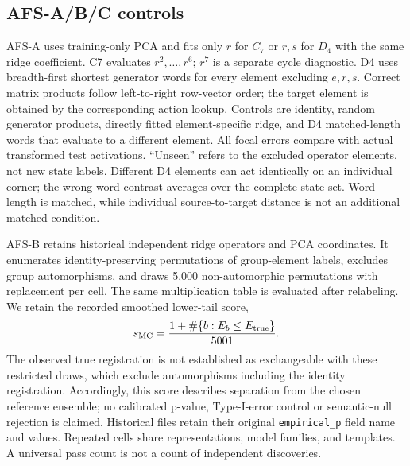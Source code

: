 \subsection{AFS-A/B/C controls}
AFS-A uses training-only PCA and fits only $r$ for $C_7$ or $r,s$ for $D_4$ with the same ridge coefficient. C7 evaluates $r^2,\ldots,r^6$; $r^7$ is a separate cycle diagnostic. D4 uses breadth-first shortest generator words for every element excluding $e,r,s$. Correct matrix products follow left-to-right row-vector order; the target element is obtained by the corresponding action lookup. Controls are identity, random generator products, directly fitted element-specific ridge, and D4 matched-length words that evaluate to a different element. All focal errors compare with actual transformed test activations. ``Unseen'' refers to the excluded operator elements, not new state labels. Different D4 elements can act identically on an individual corner; the wrong-word contrast averages over the complete state set. Word length is matched, while individual source-to-target distance is not an additional matched condition.

AFS-B retains historical independent ridge operators and PCA coordinates. It enumerates identity-preserving permutations of group-element labels, excludes group automorphisms, and draws 5,000 non-automorphic permutations with replacement per cell. The same multiplication table is evaluated after relabeling. We retain the recorded smoothed lower-tail score,
\[
 s_{\rm MC}=\frac{1+\#\{b:E_b\leq E_{\rm true}\}}{5001}.
\]
The observed true registration is not established as exchangeable with these restricted draws, which exclude automorphisms including the identity registration. Accordingly, this score describes separation from the chosen reference ensemble; no calibrated p-value, Type-I-error control or semantic-null rejection is claimed. Historical files retain their original \texttt{empirical\_p} field name and values. Repeated cells share representations, model families, and templates. A universal pass count is not a count of independent discoveries.

